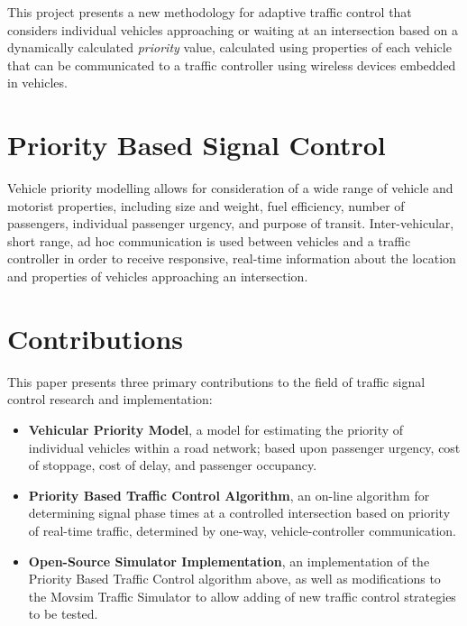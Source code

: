 This project presents a new methodology for adaptive traffic control that considers individual vehicles approaching or waiting at an intersection based on a dynamically calculated \emph{priority} value, calculated using properties of each vehicle that can be communicated to a traffic controller using wireless devices embedded in vehicles.

\section{Priority Based Signal Control}

Vehicle priority modelling allows for consideration of a wide range of vehicle and motorist properties, including size and weight, fuel efficiency, number of passengers, individual passenger urgency, and purpose of transit. Inter-vehicular, short range, ad hoc communication is used between vehicles and a traffic controller in order to receive responsive, real-time information about the location and properties of vehicles approaching an intersection. 

\section{Contributions}

This paper presents three primary contributions to the field of traffic signal control research and implementation:

\begin{itemize}
\item \textbf{Vehicular Priority Model}, a model for estimating the priority of individual vehicles within a road network; based upon passenger urgency, cost of stoppage, cost of delay, and passenger occupancy.
\item \textbf{Priority Based Traffic Control Algorithm}, an on-line algorithm for determining signal phase times at a controlled intersection based on priority of real-time traffic, determined by one-way, vehicle-controller communication. 
\item \textbf{Open-Source Simulator Implementation}, an implementation of the Priority Based Traffic Control algorithm above, as well as modifications to the Movsim Traffic Simulator to allow adding of new traffic control strategies to be tested.
\end{itemize}




